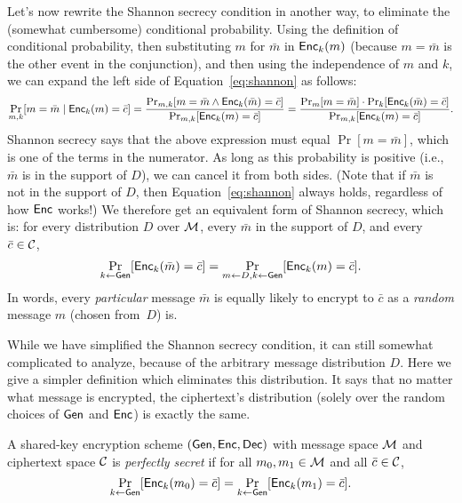 \documentclass[11pt]{article}
\begin{document}
Let's now rewrite the Shannon secrecy condition in another way, to
eliminate the (somewhat cumbersome) conditional probability.  Using
the definition of conditional probability, then substituting $m$ for
$\bar{m}$ in $\mathsf{Enc}_{k}(m)$ (because $m=\bar{m}$ is the other event
in the conjunction), and then using the independence of $m$ and $k$,
we can expand the left side of Equation~\eqref{eq:shannon} as follows:
\[ \Pr_{m,k}[m=\bar{m}\; |\; \mathsf{Enc}_{k}(m)=\bar{c}] =
\frac{\Pr_{m,k}[m = \bar{m} \wedge
  \mathsf{Enc}_{k}(\bar{m})=\bar{c}]}{\Pr_{m,k}[\mathsf{Enc}_{k}(m)=\bar{c}]} =
\frac{\Pr_{m}[m=\bar{m}] \cdot
  \Pr_{k}[\mathsf{Enc}_{k}(\bar{m})=\bar{c}]}{\Pr_{m,k}[\mathsf{Enc}_{k}(m)=\bar{c}]}. \]
Shannon secrecy says that the above expression must equal
$\Pr[m=\bar{m}]$, which is one of the terms in the numerator.  As long
as this probability is positive (i.e., $\bar{m}$ is in the support of
$D$), we can cancel it from both sides.  (Note that if $\bar{m}$ is
not in the support of $D$, then Equation~\eqref{eq:shannon} always
holds, regardless of how $\mathsf{Enc}$ works!)  We therefore get an
equivalent form of Shannon secrecy, which is: for every distribution
$D$ over $\mathcal{M}$, every $\bar{m}$ in the support of $D$, and every
$\bar{c} \in \mathcal{C}$, \[ \Pr_{k \gets
  \mathsf{Gen}}[\mathsf{Enc}_{k}(\bar{m})=\bar{c}] = \Pr_{m \gets D,k \gets
  \mathsf{Gen}}[\mathsf{Enc}_{k}(m)=\bar{c}]. \] In words, every
\emph{particular} message $\bar{m}$ is equally likely to encrypt to
$\bar{c}$ as a \emph{random} message $m$ (chosen from~$D$) is.

While we have simplified the Shannon secrecy condition, it can still
somewhat complicated to analyze, because of the arbitrary message
distribution $D$.  Here we give a simpler definition which eliminates
this distribution.  It says that no matter what message is encrypted,
the ciphertext's distribution (solely over the random choices of
$\mathsf{Gen}$ and $\mathsf{Enc}$) is exactly the same.

\begin{definition}
  \label{def:perfect-secrecy}
  A shared-key encryption scheme $(\mathsf{Gen},\mathsf{Enc},\mathsf{Dec})$ with
  message space $\mathcal{M}$ and ciphertext space $\mathcal{C}$ is
  \emph{perfectly secret} if for all $m_{0}, m_{1} \in \mathcal{M}$ and
  all $\bar{c} \in \mathcal{C}$,
  \begin{equation}
    \label{eq:perfect}
    \Pr_{k \gets \mathsf{Gen}}[\mathsf{Enc}_{k}(m_{0}) = \bar{c}] = \Pr_{k \gets
      \mathsf{Gen}}[\mathsf{Enc}_{k}(m_{1}) = \bar{c}].
  \end{equation}
\end{definition}
\end{document}
